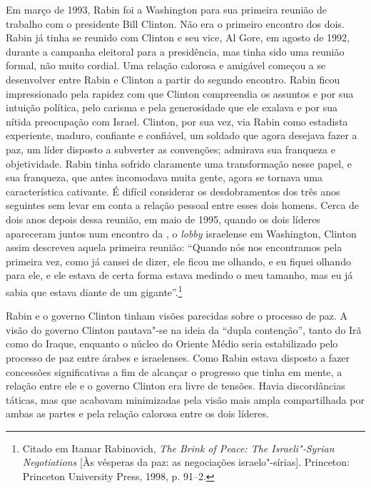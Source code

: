 Em março de 1993, Rabin foi a Washington para sua primeira reunião de
trabalho com o presidente Bill Clinton. Não era o primeiro encontro dos
dois. Rabin já tinha se reunido com Clinton e seu vice, Al Gore, em
agosto de 1992, durante a campanha eleitoral para a presidência, mas
tinha sido uma reunião formal, não muito cordial. Uma relação calorosa e
amigável começou a se desenvolver entre Rabin e Clinton a partir do
segundo encontro. Rabin ficou impressionado pela rapidez com que Clinton
compreendia os assuntos e por sua intuição política, pelo carisma e pela
generosidade que ele exalava e por sua nítida preocupação com Israel.
Clinton, por sua vez, via Rabin como estadista experiente, maduro,
confiante e confiável, um soldado que agora desejava fazer a paz, um
líder disposto a subverter as convenções; admirava sua franqueza e
objetividade. Rabin tinha sofrido claramente uma transformação nesse
papel, e sua franqueza, que antes incomodava muita gente, agora se
tornava uma característica cativante. É difícil considerar os
desdobramentos dos três anos seguintes sem levar em conta a relação
pessoal entre esses dois homens. Cerca de dois anos depois dessa
reunião, em maio de 1995, quando os dois líderes apareceram juntos num
encontro da , o \emph{lobby} israelense em Washington, Clinton assim
descreveu aquela primeira reunião: ``Quando nós nos encontramos pela
primeira vez, como já cansei de dizer, ele ficou me olhando, e eu fiquei
olhando para ele, e ele estava de certa forma estava medindo o meu
tamanho, mas eu já sabia que estava diante de um gigante''.\footnote{Citado
  em Itamar Rabinovich, \emph{The Brink of Peace: The Israeli"-Syrian
  Negotiations} {[}Às vésperas da paz: as negociações israelo"-sírias{]}. Princeton: Princeton University Press, 1998, p. 91--2.}

Rabin e o governo Clinton tinham visões parecidas sobre o processo de
paz. A visão do governo Clinton pautava"-se na ideia da ``dupla
contenção'', tanto do Irã como do Iraque, enquanto o núcleo do Oriente
Médio seria estabilizado pelo processo de paz entre árabes e
israelenses. Como Rabin estava disposto a fazer concessões
significativas a fim de alcançar o progresso que tinha em mente, a
relação entre ele e o governo Clinton era livre de tensões. Havia
discordâncias táticas, mas que acabavam minimizadas pela visão mais
ampla compartilhada por ambas as partes e pela relação calorosa entre os
dois líderes.

